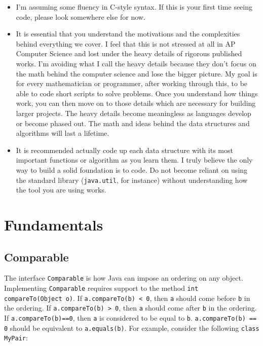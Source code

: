 \documentclass[11pt]{book}
\begin{document}
\begin{itemize}

\item

I'm assuming some fluency in C-style syntax. If this is your first time seeing code, please look somewhere else for now.

\item

It is essential that you understand the motivations and the complexities behind everything we cover. I feel that this is not stressed at all in AP Computer Science and lost under the heavy details of rigorous published works. I'm avoiding what I call the heavy details because they don't focus on the math behind the computer science and lose the bigger picture. My goal is for every mathematician or programmer, after working through this, to be able to code short scripts to solve problems. Once you understand how things work, you can then move on to those details which are necessary for building larger projects. The heavy details become meaningless as languages develop or become phased out. The math and ideas behind the data structures and algorithms will last a lifetime.

\item

It is recommended actually code up each data structure with its most important functions or algorithm as you learn them. I truly believe the only way to build a solid foundation is to code. Do not become reliant on using the standard library (\texttt{java.util}, for instance) without understanding how the tool you are using works.

\end{itemize}

\chapter{Fundamentals}

\section{Comparable}

The interface \texttt{Comparable} is how Java can impose an ordering on any object. Implementing \texttt{Comparable} requires support to the method \texttt{int compareTo(Object o)}. If \texttt{a.compareTo(b) < 0}, then \texttt{a} should come before \texttt{b} in the ordering. If \texttt{a.compareTo(b) > 0}, then \texttt{a} should come after \texttt{b} in the ordering. If \texttt{a.compareTo(b)==0}, then \texttt{a} is considered to be equal to \texttt{b}. \texttt{a.compareTo(b) == 0} should be equivalent to \texttt{a.equals(b)}. For example, consider the following \texttt{class MyPair}:
\end{document}
